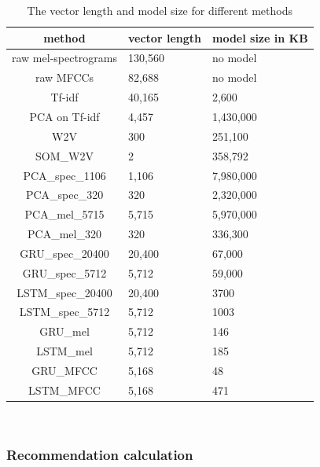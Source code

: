 \begin{table}[h]
\centering
\renewcommand{\arraystretch}{1.5}
\begin{tabu} to 1\textwidth {| c || X[c] | X[c] | }
 \hline
 \textbf{method} & \textbf{vector length} & \textbf{model size in KB} \\
 \hline
 raw mel-spectrograms & 130,560 & no model \\
 \hline 
 raw MFCCs & 82,688 & no model \\
 \hline
 Tf-idf & 40,165 & 2,600 \\
 \hline
 PCA on Tf-idf & 4,457 & 1,430,000  \\
 \hline
 W2V & 300 & 251,100 \\
 \hline
 SOM\_W2V & 2 & 358,792 \\
 \hline
 PCA\_spec\_1106 & 1,106 & 7,980,000 \\
 \hline
 PCA\_spec\_320 & 320 & 2,320,000\\
 \hline
 PCA\_mel\_5715 & 5,715 & 5,970,000\\
 \hline
 PCA\_mel\_320 & 320 & 336,300 \\
 \hline
 GRU\_spec\_20400 & 20,400 & 67,000 \\
 \hline
 GRU\_spec\_5712 & 5,712 & 59,000 \\
 \hline
 LSTM\_spec\_20400 & 20,400 & 3700 \\
 \hline
 LSTM\_spec\_5712 & 5,712 & 1003 \\
 \hline
 GRU\_mel & 5,712 & 146 \\
 \hline
 LSTM\_mel & 5,712 & 185 \\
 \hline
 GRU\_MFCC & 5,168 & 48 \\
 \hline
 LSTM\_MFCC & 5,168 & 471 \\
 \hline
 \end{tabu} \\
\caption{The vector length and model size for different methods}
\label{table:time_space_complexities}
\end{table}

\subsubsection{Recommendation calculation}\label{ssec:recom_calcs}

